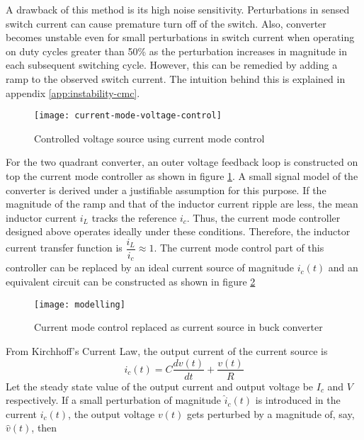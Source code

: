 	A drawback of this method is its high noise sensitivity. Perturbations in sensed switch current can cause premature turn off of the switch. Also, converter becomes unstable even for small perturbations in switch current when operating on duty cycles greater than 50\% as the perturbation increases in magnitude in each subsequent switching cycle. However, this can be remedied by adding a ramp to the observed switch current. The intuition behind this is explained in appendix \ref{app:instability-cmc}.
	\begin{figure}[h]
		\centering
		\texttt{[image: current-mode-voltage-control]}
		\caption{Controlled voltage source using current mode control}
		\label{fig:24}
	\end{figure}
	For the two quadrant converter, an outer voltage feedback loop is constructed on top the current mode controller as shown in figure \ref{fig:24}. A small signal model of the converter is derived under a justifiable assumption for this purpose. If the magnitude of the ramp and that of the inductor current ripple are less, the mean inductor current $i_L$ tracks the reference $i_c$. Thus, the current mode controller designed above operates ideally under these conditions. Therefore, the inductor current transfer function is $\dfrac{i_L}{i_c} \approx 1$. The current mode control part of this controller can be replaced by an ideal current source of magnitude $i_c(t)$ and an equivalent circuit can be constructed as shown in figure \ref{fig:25}
	\begin{figure}[h]
		\centering
		\texttt{[image: modelling]}
		\caption{Current mode control replaced as current source in buck converter}
		\label{fig:25}
	\end{figure}
	From Kirchhoff's Current Law, the output current of the current source is
	\begin{equation}
		i_c(t) = C\dfrac{dv(t)}{dt} + \dfrac{v(t)}{R}
		\label{eq:cmc-1}
	\end{equation}
	Let the steady state value of the output current and output voltage be $I_c$ and $V$ respectively. If a small perturbation of magnitude $\hat{i}_c(t)$ is introduced in the current $i_c(t)$, the output voltage $v(t)$ gets perturbed by a magnitude of, say, $\hat{v}(t)$, then
